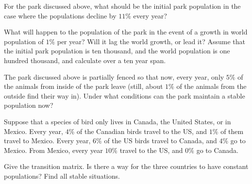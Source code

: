 \begin{exercises}
  \item 
    For the park discussed above, what should be the initial park population
    in the
    case where the populations decline by $11\%$ every year?
  \item 
    What will happen to the population of the park in the event of
    a growth in world population of $1\%$ per year?
    Will it lag the world growth, or lead it?
    Assume that the initial park population is ten thousand, and the
    world population is one hundred thousand, 
    and calculate over a ten year span.
  \item 
    The park discussed above is partially fenced so that now,
    every year, only $5\%$ of the animals from inside of the park leave (still,
    about $1\%$ of the animals from the outside 
    find their way in).
    Under what conditions can the park maintain a stable population now?
  \item 
    Suppose that a species of bird only lives in Canada, the United States,
    or in Mexico.
    Every year, $4\%$ of the Canadian birds travel to the US, and $1\%$ of them
    travel to Mexico.
    Every year, $6\%$ of the US birds travel to Canada, and $4\%$ go to Mexico.
    From Mexico, every year $10\%$ travel to the US, and $0\%$ go to Canada.
    \begin{exparts}
      \partsitem Give the transition matrix.
      \partsitem Is there a way for the three countries to have constant
         populations?
      \partsitem Find all stable situations.   
    \end{exparts}
\end{exercises}
\endinput







